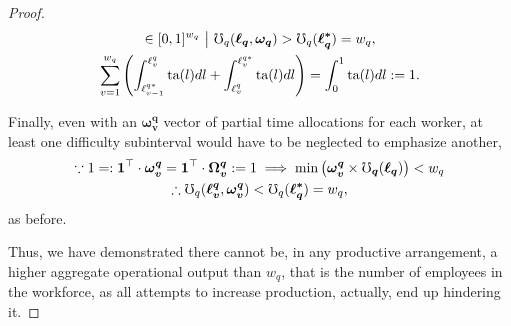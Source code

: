 \documentclass[hidelinks, nonatbib]{elsarticle}
\begin{document}
\begin{lemma}
\begin{proof}
\begin{gather}
            \in
            [0,1]^{w_q}
            \
            \big|
            \
            \mho_{q}(
                \boldsymbol{\ell_q}
                ,\boldsymbol{\omega_q}
            ) 
            >
            \mho_{q}(
                \boldsymbol{\ell_{q}^{*}}
            )
            =
            w_q
            ,
            \\
            \sum_{v=1}^{w_q}
            \left(
                \int_{
                    \ell_{v-1}^{q*}
                }^{
                    \ell_{v}^{q}
                }
                \text{ta}(l)dl
                +
                \int_{
                    \ell_{v}^{q}
                }^{
                    \ell_{v}^{q*}
                }
                \text{ta}(l)dl
            \right)
            =
            \int_{0}^{1}
            \text{ta}(l)dl
            :=
            1
            .
        \end{gather}
        
        Finally, even with an $\boldsymbol{\omega_{v}^{q}}$ vector of partial time allocations for each worker, at least one difficulty subinterval would have to be neglected to emphasize another,
        \begin{gather}
            \because
            1 =:
            \boldsymbol{1} ^ \top
            \cdot
            \boldsymbol{\omega_{v}^{q}}
            =
            \boldsymbol{1} ^ \top
            \cdot
            \boldsymbol{\Omega_{v}^{q}}
            := 1
            \implies
            \min\left(
                \boldsymbol{\omega_{v}^{q}}
                \times
                \boldsymbol{\mho_q}(
                    \boldsymbol{\ell_{q}}
                )
            \right)
            <
            w_q
            \\
            \therefore
            \mho_q(
                \boldsymbol{\ell_{v}^{q}},
                \boldsymbol{\omega_{v}^{q}}
            )
            <
            \mho_q(
                \boldsymbol{\ell_{q}^{*}}
            )
            =
            w_q
            ,
        \end{gather}
        as before.
        
        Thus, we have demonstrated there cannot be, in any productive arrangement, a higher aggregate operational output than $w_q$, that is the number of employees in the workforce, as all attempts to increase production, actually, end up hindering it. 
        

\end{proof}
\end{lemma}
\end{document}
